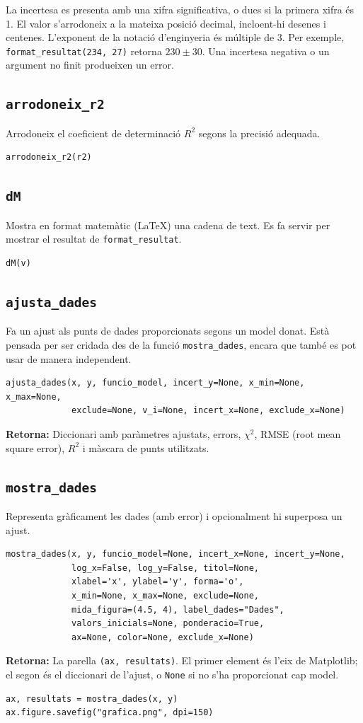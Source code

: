 \documentclass[11pt,a4paper]{article}
\begin{document}
La incertesa es presenta amb una xifra significativa, o dues si la primera
xifra és 1. El valor s'arrodoneix a la mateixa posició decimal, incloent-hi
desenes i centenes. L'exponent de la notació d'enginyeria és múltiple de 3.
Per exemple, \texttt{format\_resultat(234, 27)} retorna \(230\pm30\).
Una incertesa negativa o un argument no finit produeixen un error.

\subsection{\texttt{arrodoneix\_r2}}
Arrodoneix el coeficient de determinació \(R^2\) segons la precisió adequada.
\begin{lstlisting}
arrodoneix_r2(r2)
\end{lstlisting}

\subsection{\texttt{dM}}
Mostra en format matemàtic (\LaTeX) una cadena de text. Es fa servir per mostrar el resultat de  \texttt{format\_resultat}.
\begin{lstlisting}
dM(v)
\end{lstlisting}

\subsection{\texttt{ajusta\_dades}}
Fa un ajust als punts de dades proporcionats segons un model donat. Està pensada per ser cridada des de la funció \texttt{mostra\_dades}, encara que també es pot usar de manera independent.
\begin{lstlisting}
ajusta_dades(x, y, funcio_model, incert_y=None, x_min=None, x_max=None, 
             exclude=None, v_i=None, incert_x=None, exclude_x=None)
\end{lstlisting}
\textbf{Retorna:} Diccionari amb paràmetres ajustats, errors, \(\chi^2\), RMSE (root mean square error), \(R^2\) i màscara de punts utilitzats.

\subsection{\texttt{mostra\_dades}}
Representa gràficament les dades (amb error) i opcionalment hi superposa un ajust.
\begin{lstlisting}
mostra_dades(x, y, funcio_model=None, incert_x=None, incert_y=None,
             log_x=False, log_y=False, titol=None,
             xlabel='x', ylabel='y', forma='o',
             x_min=None, x_max=None, exclude=None, 
             mida_figura=(4.5, 4), label_dades="Dades",
             valors_inicials=None, ponderacio=True,
             ax=None, color=None, exclude_x=None)
\end{lstlisting}
\textbf{Retorna:} La parella \texttt{(ax, resultats)}. El primer element és
l'eix de Matplotlib; el segon és el diccionari de l'ajust, o \texttt{None}
si no s'ha proporcionat cap model.
\begin{lstlisting}
ax, resultats = mostra_dades(x, y)
ax.figure.savefig("grafica.png", dpi=150)
\end{lstlisting}
\end{document}
